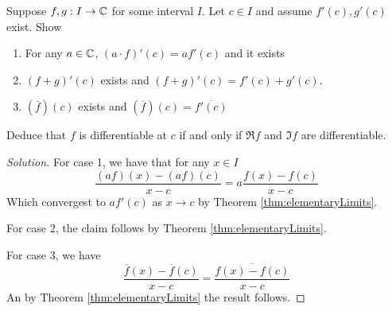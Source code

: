 \begin{exercise}
  Suppose $f,g:I\to\mathbb C$ for some interval $I$. Let $c\in I$ and assume $f'(c),g'(c)$
  exist. Show 
  \begin{enumerate}
    \item For any $a\in\mathbb C$, $(a\cdot f)'(c)=af'(c)$ and it exists
    \item $(f+g)'(c)$ exists and $(f+g)'(c)=f'(c) + g'(c)$.
    \item $(\overline{f})(c)$ exists and $(\overline{f})(c)= \overline{f'(c)}$
  \end{enumerate}
  Deduce that $f$ is differentiable at $c$ if and only if $\Re f$ and $\Im f$ are
  differentiable.
\end{exercise}
\begin{proof} [Solution]
  For case 1, we have that for any $x\in I$
  \[\frac{(af)(x)-(af)(c)}{x-c} = a\frac{f(x)-f(c)}{x-c}\]
  Which convergest to $af'(c)$ as $x\to c$ by Theorem \ref{thm:elementaryLimits}.

  For case 2, the claim follows by Theorem \ref{thm:elementaryLimits}.

  For case 3, we have 
  \[\frac{\overline{f}(x) - \overline{f}(c)}{x-c} = \frac{\overline{f(x)-f(c)}}{x-c}\]
  An by Theorem \ref{thm:elementaryLimits} the result follows.
\end{proof}

